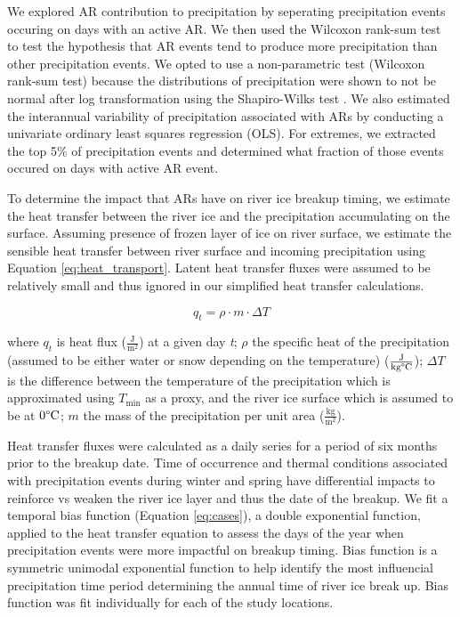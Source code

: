 \documentclass[12pts,draft]{AR_analysis_}
\begin{document}
We explored AR contribution to precipitation by seperating precipitation
events occuring on days with an active AR.
We then used the Wilcoxon rank-sum test \cite{Rey2011} to test 
the hypothesis 
that AR events tend to produce more precipitation than other
precipitation events. We opted to use a non-parametric 
test (Wilcoxon rank-sum test) 
because the distributions of precipitation were shown to
not be normal after log transformation using the
Shapiro-Wilks test \cite{shapiro_wilk_test}. We also estimated
the interannual variability of precipitation associated with ARs by
conducting a univariate ordinary least squares regression (OLS). 
For extremes, we extracted the top 5\% of precipitation events and determined 
what fraction of those events occured on days with active AR event. 

To determine the impact that ARs have on river ice breakup timing, 
we estimate the heat transfer between the river ice and 
the precipitation accumulating on the surface. 
Assuming presence of frozen layer of ice on river surface, we estimate
the sensible heat transfer between river surface and incoming
precipitation using Equation \ref{eq:heat_transport}. Latent heat
transfer fluxes were assumed to be relatively small and thus ignored in our simplified 
heat transfer calculations.

\begin{equation}
q_{t} = \rho \cdot m \cdot \Delta T 
	\label{eq:heat_transport}
\end{equation}

\noindent where $q_{t}$ is heat flux ($\mathrm{\frac{J}{m^2}}$) at a 
given day \emph{t}; 
$\rho$ the specific heat 
of the precipitation (assumed to be either water or 
snow depending on the temperature)
($\mathrm{\frac{J}{kg \degree C}}$); $\Delta T$ is the difference between 
the temperature of the precipitation which is approximated 
using $T_{\text{min}}$ as a proxy, and the river ice surface which is
assumed to be at $\mathrm{0\degree C}$; $m$ 
the mass of the precipitation per unit area ($\mathrm{\frac{kg}{m^{2}}}$). 

Heat transfer fluxes were calculated as a daily series for a period of six
months prior to the breakup date. Time of occurrence and thermal
conditions associated with precipitation events during winter and spring
have differential impacts to reinforce vs weaken the river ice layer and
thus the date of the breakup.  
We fit a temporal bias function (Equation \ref{eq:cases}), a double
exponential function, applied to the heat transfer equation to assess 
the days of the year when precipitation events were more 
impactful on breakup timing. Bias function is a symmetric unimodal
exponential function to help identify the most influencial precipitation
time period determining the annual time of river ice break up. Bias
function was fit individually for each of the study locations. 
\end{document}
